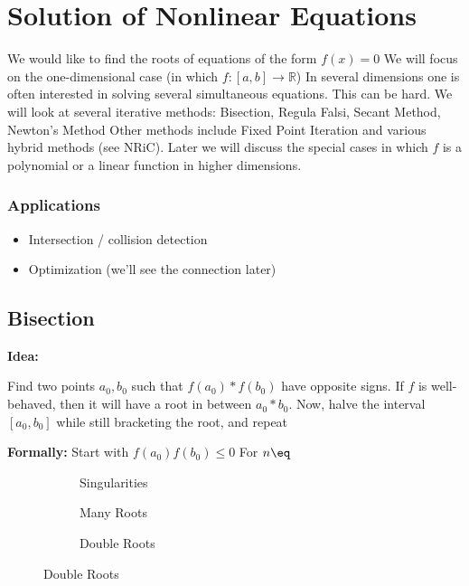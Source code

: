    \chapter{Solution of Nonlinear Equations}
    We would like to find the roots of equations of the form $f(x) = 0$
    We will focus on the one-dimensional case (in which $f:[a, b] \rightarrow \mathbb{R}$)
    In several dimensions one is often interested in solving several simultaneous equations.
    This can be hard.
    We will look at several iterative methods: Bisection, Regula Falsi, Secant Method, Newton's Method
    Other methods include Fixed Point Iteration and various hybrid methods (see NRiC). 
    Later we will discuss the special cases in which $f$ is a polynomial or a linear function in higher dimensions. 
    \subsection*{Applications}
    \begin{itemize}
        \item Intersection / collision detection
        \item Optimization (we'll see the connection later)
    \end{itemize}
    
    \section{Bisection}
    \textbf{Idea:}
    \begin{description}
        Find two points $a_0, b_0$ such that $f(a_0) * f(b_0)$ have opposite signs. 
        If $f$ is well-behaved, then it will have a root in between $a_0 * b_0$. 
        Now, halve the interval $[a_0, b_0]$ while still bracketing the root, and repeat
    \end{description}
    
    \textbf{Formally:}
    Start with $f(a_0)f(b_0) \leq 0$
    For $n \eq$
    
    \begin{figure}
      \centering
      \begin{subfigure}[b]{0.3\textwidth}
        \resizebox{\textwidth}{!}{
          
        }
        \caption{Singularities}
      \end{subfigure}
      \begin{subfigure}[b]{0.3\textwidth}
        \resizebox{\textwidth}{!}{
          
        }
        \caption{Many Roots}
      \end{subfigure}
      \begin{subfigure}[b]{0.3\textwidth}
        \resizebox{\textwidth}{!}{
          
        }
        \caption{Double Roots}
      \end{subfigure}
      \label{fig:difficult-root-finding}
    \end{figure}

